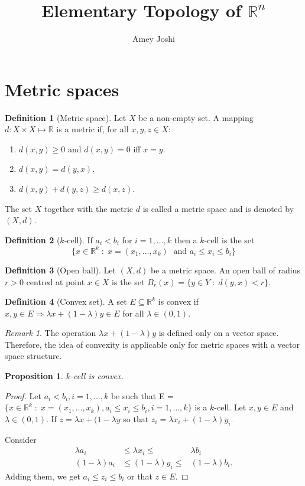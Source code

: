 \documentclass{article}
\theoremstyle{plain}
\numberwithin{thm}{section}
\theoremstyle{plain}
\newtheorem{prop}{Proposition}
\numberwithin{prop}{section}
\theoremstyle{definition}
\newtheorem{defn}{Definition}
\numberwithin{defn}{section}
\theoremstyle{remark}
\newtheorem*{rem}{Remark}
\numberwithin{equation}{section}
\begin{document}
\title{Elementary Topology of $\mathbb{R}^n$}
\author{Amey Joshi}
\maketitle
\section{Metric spaces}\label{s1}
\begin{defn}[Metric space]\label{s1d1}
Let $X$ be a non-empty set. A mapping $d: X \times X \mapsto \mathbb{R}$ is
a metric if, for all $x, y, z \in X$:
\begin{enumerate}
\item $d(x, y) \ge 0$ and $d(x, y) = 0$ iff $x = y$.
\item $d(x, y) = d(y, x)$.
\item $d(x, y) + d(y, z) \ge d(x, z)$.
\end{enumerate}
The set $X$ together with the metric $d$ is called a metric space and is
denoted by $(X, d)$.
\end{defn}

\begin{defn}[$k$-cell]\label{s1d2}
If $a_i < b_i$ for $i = 1, \ldots, k$ then a $k$-cell is the set 
\[
\{x \in \mathbb{R}^k\;:\; x = (x_1, \ldots, x_k)\;\text{ and } a_i \le x_i \le
b_i\}
\]
\end{defn}

\begin{defn}[Open ball]\label{s1d3}
Let $(X, d)$ be a metric space. An open ball of radius $r > 0$ centred at 
point $x \in X$ is the set $B_r(x) = \{y \in Y \;:\; d(y, x) < r\}$.
\end{defn}

\begin{defn}[Convex set]\label{s1d4}
A set $E \subseteq \mathbb{R}^k$ is convex if $x, y \in E \Rightarrow \lambda x
+ (1 - \lambda)y \in E$ for all $\lambda \in (0, 1)$.
\end{defn}
\begin{rem}
The operation $\lambda x + (1 - \lambda)y$ is defined only on a vector space.
Therefore, the idea of convexity is applicable only for metric spaces with a
vector space structure.
\end{rem}

\begin{prop}\label{s1p1}
$k$-cell is convex.
\end{prop}
\begin{proof}
Let $a_i < b_i, i = 1, \ldots, k$ be such that E = $\{x \in \mathbb{R}^k \;:\;
x = (x_1, \ldots, x_k), a_i \le x_i \le b_i, i = 1, \ldots, k\}$ is a $k$-cell.
Let $x, y \in E$ and $\lambda \in (0, 1)$. If $z = \lambda x + (1 - \lambda y$
so that $z_i = \lambda x_i + (1 - \lambda)y_i$.

Consider
\begin{eqnarray*}
\lambda a_i &\le \lambda x_i \le& \lambda b_i \\
(1 - \lambda) a_i &\le (1 - \lambda)y_i \le & (1 - \lambda)b_i.
\end{eqnarray*}
Adding them, we get $a_i \le z_i \le b_i$ or that $z \in E$.
\end{proof}
\end{document}
